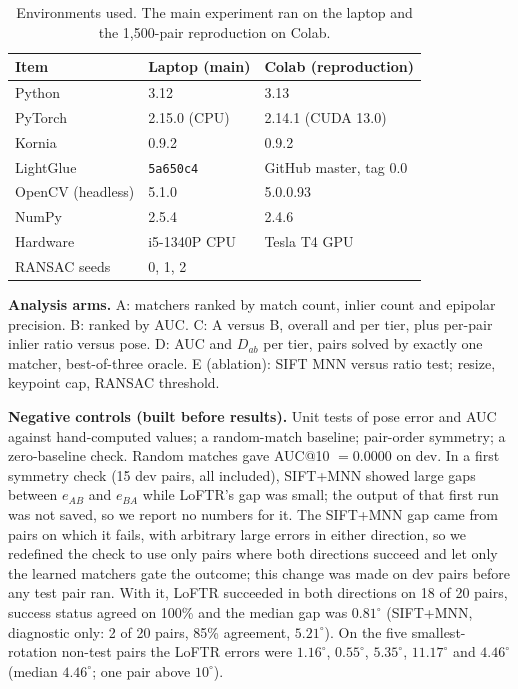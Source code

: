 \documentclass[10pt,twocolumn,letterpaper]{article}
\newcommand{\dg}{^{\circ}}
\begin{document}
\begin{table}[t]\centering\footnotesize
\begin{tabular}{@{}lll@{}}\toprule Item & Laptop (main) & Colab (reproduction)\\\midrule
Python & 3.12 & 3.13\\
PyTorch & 2.15.0 (CPU) & 2.14.1 (CUDA 13.0)\\
Kornia & 0.9.2 & 0.9.2\\
LightGlue & \texttt{5a650c4} & GitHub master, tag 0.0\\
OpenCV (headless) & 5.1.0 & 5.0.0.93\\
NumPy & 2.5.4 & 2.4.6\\
Hardware & i5-1340P CPU & Tesla T4 GPU\\
RANSAC seeds & \multicolumn{2}{l}{0, 1, 2}\\ \bottomrule\end{tabular}
\caption{Environments used. The main experiment ran on the laptop and the 1{,}500-pair reproduction on Colab.}\label{tab:env}\end{table}

\noindent\textbf{Analysis arms.} A: matchers ranked by match count, inlier count and epipolar precision. B: ranked by AUC. C: A versus B, overall and per tier, plus per-pair inlier ratio versus pose. D: AUC and $D_{ab}$ per tier, pairs solved by exactly one matcher, best-of-three oracle. E (ablation): SIFT MNN versus ratio test; resize, keypoint cap, RANSAC threshold.

\noindent\textbf{Negative controls (built before results).} Unit tests of pose error and AUC against hand-computed values; a random-match baseline; pair-order symmetry; a zero-baseline check. Random matches gave AUC@10 $=0.0000$ on dev. In a first symmetry check (15 dev pairs, all included), SIFT+MNN showed large gaps between $e_{AB}$ and $e_{BA}$ while LoFTR's gap was small; the output of that first run was not saved, so we report no numbers for it. The SIFT+MNN gap came from pairs on which it fails, with arbitrary large errors in either direction, so we redefined the check to use only pairs where both directions succeed and let only the learned matchers gate the outcome; this change was made on dev pairs before any test pair ran. With it, LoFTR succeeded in both directions on 18 of 20 pairs, success status agreed on 100\% and the median gap was $0.81\dg$ (SIFT+MNN, diagnostic only: 2 of 20 pairs, 85\% agreement, $5.21\dg$). On the five smallest-rotation non-test pairs the LoFTR errors were $1.16\dg$, $0.55\dg$, $5.35\dg$, $11.17\dg$ and $4.46\dg$ (median $4.46\dg$; one pair above $10\dg$).
\end{document}
